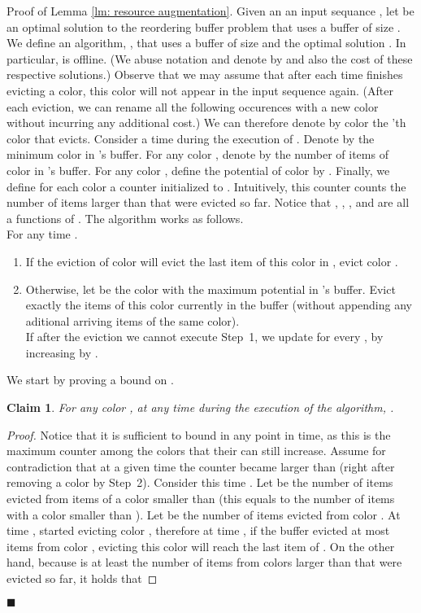 \documentclass[12pt]{article}
\newtheorem{claim}[theorem]{Claim}
\newenvironment{proofof}[1]{ {\sc Proof of #1.}\/}{\qedsymbol}
\renewcommand{\qedsymbol}{\ensuremath{\blacksquare}}
\begin{document}
\newpage
\appendix
\begin{proofof}{Lemma \ref{lm: resource augmentation}}
Given an an input sequance , let  be an optimal solution to the reordering buffer problem
that uses a buffer of size .
We define an algorithm, , that uses a buffer of size  and the optimal solution . 
In particular,  is offline. (We abuse notation and denote by 
 and  also the cost of these respective solutions.)
Observe that we may assume that after each time  finishes evicting
a color, this color will not appear in the input sequence again.
(After each eviction, we can rename all the following occurences 
with a new color  without incurring any additional cost.)
We can therefore denote by color  the 'th color that 
evicts.
Consider a time  during the execution of .
Denote by  the minimum color in 's buffer.
For any color , denote by  the number of items
of color  in 's buffer. For any color , 
define the potential  of color  by .
Finally, we define for each color  a counter  initialized
to . Intuitively, this counter counts the number of items 
larger than  that were evicted so far.
Notice that , , , and  are all a functions of 
. 
The algorithm  works as follows.\\
For any time .
\begin{enumerate}
\item If the eviction of color  will evict 
the last item of this color in , evict color . 
\item Otherwise, let  be the color with the maximum potential
in 's buffer. Evict exactly the  items of this color
currently in the buffer (without appending any aditional 
arriving items of the same color).\\
If after the eviction we cannot execute Step~1, we update 
 for every , by increasing  by .
\end{enumerate}

We start by proving a bound on .
\begin{claim}
For any color , at any time during the execution of the algorithm, 
.
\end{claim}
\begin{proof}
Notice that it is sufficient to bound  in any point in time,
as this is the maximum counter among the colors that their 
 can still increase.
Assume for contradiction that at a given time  the counter 
 became larger than  (right after removing a color by Step~2). 
Consider this time . Let  be the number of items  evicted from 
items of a color smaller than  (this equals to the number of items with
 a color smaller than ). Let  be the 
number of items  evicted from color .
At time ,  started evicting color ,
therefore at time , if the buffer evicted at
most  items from color , evicting this color will reach 
the last item of .
On the other hand, 
because  is at least the number of items from colors larger than
 that were evicted so far,
it holds that 


\end{proof}
\end{proofof}
\end{document}
